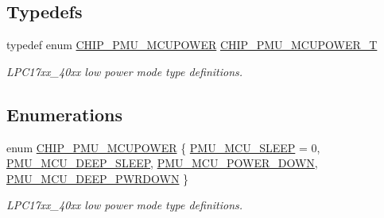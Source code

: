 \subsection*{Typedefs}
\begin{DoxyCompactItemize}
\item 
typedef enum \hyperlink{group__PMU__17XX__40XX_gae5e1b53b190a2a25a80b4a6e93c55fa5}{C\-H\-I\-P\-\_\-\-P\-M\-U\-\_\-\-M\-C\-U\-P\-O\-W\-E\-R} \hyperlink{group__PMU__17XX__40XX_ga724dd269fe2bbc43740331f35c3bf463}{C\-H\-I\-P\-\_\-\-P\-M\-U\-\_\-\-M\-C\-U\-P\-O\-W\-E\-R\-\_\-\-T}
\begin{DoxyCompactList}\small\item\em L\-P\-C17xx\-\_\-40xx low power mode type definitions. \end{DoxyCompactList}\end{DoxyCompactItemize}
\subsection*{Enumerations}
\begin{DoxyCompactItemize}
\item 
enum \hyperlink{group__PMU__17XX__40XX_gae5e1b53b190a2a25a80b4a6e93c55fa5}{C\-H\-I\-P\-\_\-\-P\-M\-U\-\_\-\-M\-C\-U\-P\-O\-W\-E\-R} \{ \hyperlink{group__PMU__17XX__40XX_ggae5e1b53b190a2a25a80b4a6e93c55fa5a642a6452710738e476df4c9873f8d53c}{P\-M\-U\-\_\-\-M\-C\-U\-\_\-\-S\-L\-E\-E\-P} = 0, 
\hyperlink{group__PMU__17XX__40XX_ggae5e1b53b190a2a25a80b4a6e93c55fa5a520bf4cb3d4ae81e7fc2b6da77117089}{P\-M\-U\-\_\-\-M\-C\-U\-\_\-\-D\-E\-E\-P\-\_\-\-S\-L\-E\-E\-P}, 
\hyperlink{group__PMU__17XX__40XX_ggae5e1b53b190a2a25a80b4a6e93c55fa5ae57e035fd3a4f9fa956fbc8668030f8d}{P\-M\-U\-\_\-\-M\-C\-U\-\_\-\-P\-O\-W\-E\-R\-\_\-\-D\-O\-W\-N}, 
\hyperlink{group__PMU__17XX__40XX_ggae5e1b53b190a2a25a80b4a6e93c55fa5a23fed3c82386a96e38fcf19bc6ec20a6}{P\-M\-U\-\_\-\-M\-C\-U\-\_\-\-D\-E\-E\-P\-\_\-\-P\-W\-R\-D\-O\-W\-N}
 \}
\begin{DoxyCompactList}\small\item\em L\-P\-C17xx\-\_\-40xx low power mode type definitions. \end{DoxyCompactList}\end{DoxyCompactItemize}
